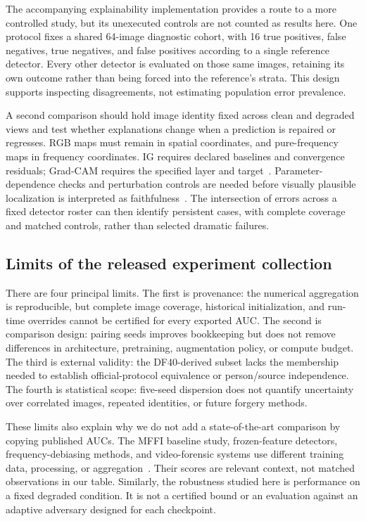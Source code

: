\documentclass[conference,10pt,letterpaper]{IEEEtran}
\begin{document}
The accompanying explainability implementation provides a route to a more controlled study, but its unexecuted controls are not counted as results here. One protocol fixes a shared 64-image diagnostic cohort, with 16 true positives, false negatives, true negatives, and false positives according to a single reference detector. Every other detector is evaluated on those same images, retaining its own outcome rather than being forced into the reference's strata. This design supports inspecting disagreements, not estimating population error prevalence.

A second comparison should hold image identity fixed across clean and degraded views and test whether explanations change when a prediction is repaired or regresses. RGB maps must remain in spatial coordinates, and pure-frequency maps in frequency coordinates. IG requires declared baselines and convergence residuals; Grad-CAM requires the specified layer and target~\cite{sundararajan2017,selvaraju2017}. Parameter-dependence checks and perturbation controls are needed before visually plausible localization is interpreted as faithfulness~\cite{adebayo2018}. The intersection of errors across a fixed detector roster can then identify persistent cases, with complete coverage and matched controls, rather than selected dramatic failures.

\subsection{Limits of the released experiment collection}
There are four principal limits. The first is provenance: the numerical aggregation is reproducible, but complete image coverage, historical initialization, and run-time overrides cannot be certified for every exported AUC. The second is comparison design: pairing seeds improves bookkeeping but does not remove differences in architecture, pretraining, augmentation policy, or compute budget. The third is external validity: the DF40-derived subset lacks the membership needed to establish official-protocol equivalence or person/source independence. The fourth is statistical scope: five-seed dispersion does not quantify uncertainty over correlated images, repeated identities, or future forgery methods.

These limits also explain why we do not add a state-of-the-art comparison by copying published AUCs. The MFFI baseline study, frozen-feature detectors, frequency-debiasing methods, and video-forensic systems use different training data, processing, or aggregation~\cite{miao2025,ojha2023,kashiani2025,li2020celeb}. Their scores are relevant context, not matched observations in our table. Similarly, the robustness studied here is performance on a fixed degraded condition. It is not a certified bound or an evaluation against an adaptive adversary designed for each checkpoint.
\end{document}
